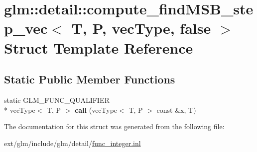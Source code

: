 \hypertarget{structglm_1_1detail_1_1compute__find_m_s_b__step__vec_3_01_t_00_01_p_00_01vec_type_00_01false_01_4}{\section{glm\-:\-:detail\-:\-:compute\-\_\-find\-M\-S\-B\-\_\-step\-\_\-vec$<$ T, P, vec\-Type, false $>$ Struct Template Reference}
\label{structglm_1_1detail_1_1compute__find_m_s_b__step__vec_3_01_t_00_01_p_00_01vec_type_00_01false_01_4}
}
\subsection*{Static Public Member Functions}
\begin{DoxyCompactItemize}
\item 
\hypertarget{structglm_1_1detail_1_1compute__find_m_s_b__step__vec_3_01_t_00_01_p_00_01vec_type_00_01false_01_4_a6be49d6f06a7dd467a63a87a6d2af757}{static G\-L\-M\-\_\-\-F\-U\-N\-C\-\_\-\-Q\-U\-A\-L\-I\-F\-I\-E\-R \\*
vec\-Type$<$ T, P $>$ {\bfseries call} (vec\-Type$<$ T, P $>$ const \&x, T)}\label{structglm_1_1detail_1_1compute__find_m_s_b__step__vec_3_01_t_00_01_p_00_01vec_type_00_01false_01_4_a6be49d6f06a7dd467a63a87a6d2af757}

\end{DoxyCompactItemize}


The documentation for this struct was generated from the following file\-:\begin{DoxyCompactItemize}
\item 
ext/glm/include/glm/detail/\hyperlink{func__integer_8inl}{func\-\_\-integer.\-inl}\end{DoxyCompactItemize}
